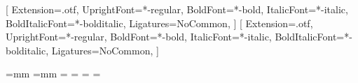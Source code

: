 %
%
\setmainfont{texgyreheros}[
  Extension=.otf,
  UprightFont=*-regular,
  BoldFont=*-bold,
  ItalicFont=*-italic,
  BoldItalicFont=*-bolditalic,
  Ligatures=NoCommon,
]
\setsansfont{texgyreheros}[
  Extension=.otf,
  UprightFont=*-regular,
  BoldFont=*-bold,
  ItalicFont=*-italic,
  BoldItalicFont=*-bolditalic,
  Ligatures=NoCommon,
]
\renewcommand{\familydefault}{\sfdefault}
\usepackage{tikz}
\makeatletter
\paperwidth=\EndleafLabelW mm
\paperheight=\EndleafLabelH mm
\pdfpagewidth=\paperwidth
\pdfpageheight=\paperheight
\hoffset=-1in
\voffset=-1in
\oddsidemargin=0pt
\evensidemargin=0pt
\topmargin=0pt
\headheight=0pt
\headsep=0pt
\footskip=0pt
\marginparwidth=0pt
\marginparsep=0pt
\textwidth=\paperwidth
\textheight=\paperheight
\parindent=0pt
\parskip=0pt
\pagestyle{empty}
\newdimen\EndleafModule
\newdimen\EndleafGap \EndleafGap=2mm
\newdimen\EndleafCol
\newdimen\EndleafW
\newdimen\EndleafColX
\newdimen\EndleafTop
\newdimen\EndleafBottom
\newdimen\EndleafQrSide
\newcount\EndleafLabelNo
\def\EndleafPt#1{\strip@pt#1}
\def\q#1#2#3#4{\fill(#1,#2)rectangle(#3,#4);}
\def\EndleafSegJoin#1#2{\ifx#2\@empty\else\ifx\EndleafSpecText\@empty
  \def\EndleafSpecText{#2}\else\expandafter\def\expandafter\EndleafSpecText
  \expandafter{\EndleafSpecText\ #2}\fi\fi}
